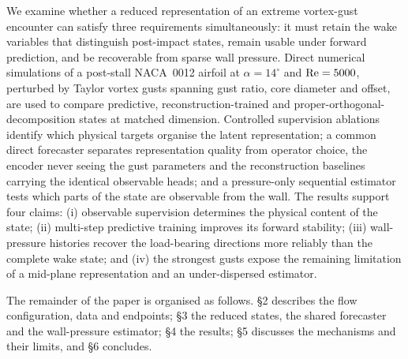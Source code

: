 We examine whether a reduced representation of an extreme vortex-gust encounter can satisfy three requirements simultaneously: it must retain the wake variables that distinguish post-impact states, remain usable under forward prediction, and be recoverable from sparse wall pressure. Direct numerical simulations of a post-stall NACA~0012 airfoil at $\alpha = 14^\circ$ and $\mathrm{Re} = 5000$, perturbed by Taylor vortex gusts spanning gust ratio, core diameter and offset, are used to compare predictive, reconstruction-trained and proper-orthogonal-decomposition states at matched dimension. Controlled supervision ablations identify which physical targets organise the latent representation; a common direct forecaster separates representation quality from operator choice, the encoder never seeing the gust parameters and the reconstruction baselines carrying the identical observable heads; and a pressure-only sequential estimator tests which parts of the state are observable from the wall. The results support four claims: (i) observable supervision determines the physical content of the state; (ii) multi-step predictive training improves its forward stability; (iii) wall-pressure histories recover the load-bearing directions more reliably than the complete wake state; and (iv) the strongest gusts expose the remaining limitation of a mid-plane representation and an under-dispersed estimator.\re

The remainder of the paper is organised as follows. \S 2 describes the flow configuration, data and endpoints; \S 3 the reduced states, the shared forecaster and the wall-pressure estimator; \S 4 the results; \S 5 discusses the mechanisms and their limits, and \S 6 concludes.\re

